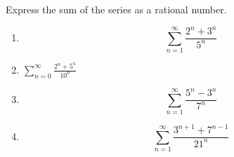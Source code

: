 Express the sum of the series as a rational number.
\begin{multicols}{2}
\begin{enumerate}[ref={\fcProblemRef}]
\item 
\label{problemSum(2^n+3^n)/(5^n)}
\[
\sum\limits_{n=1}^{\infty} \frac{2^n+3^n}{5^n}
\]


\item \label{problemsumn=0^infty(2^n+5^n)/10^n}
$\displaystyle\sum_{n=0}^{\infty} \frac{2^n+5^n}{10^n}$

\item \label{problemSum(3^n+5^n)/(7^n)}
\[
\sum\limits_{n=1}^{\infty} \frac{5^n-3^n}{7^n}
\]

\item \label{sum_n=1^infty(3^(n+1)+7^(n-1))/21^n}
\[
\sum_{n=1}^\infty \frac{3^{n+1}+7^{n-1}}{21^n}
\]


\end{enumerate}
\end{multicols}